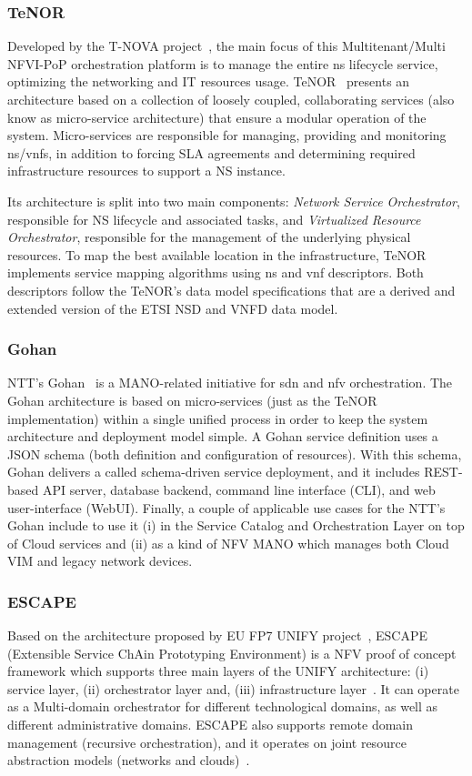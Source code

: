 \subsubsection{TeNOR}
Developed by the T-NOVA project~\cite{FP7projectT-NOVAT-NOVAInfrastructures}, the main focus of this Multitenant/Multi NFVI-PoP orchestration platform is to manage the entire \gls{ns} lifecycle service, optimizing the networking and IT resources usage. TeNOR~\cite{7502419} presents an architecture based on a collection of loosely coupled, collaborating services (also know as micro-service architecture) that ensure a modular operation of the system. Micro-services are responsible for managing, providing and monitoring \gls{ns}/\glspl{vnf}, in addition to forcing SLA agreements and determining required infrastructure resources to support a NS instance. 

Its architecture is split into two main components: \textit{Network Service Orchestrator}, responsible for NS lifecycle and associated tasks, and \textit{Virtualized Resource Orchestrator}, responsible for the management of the underlying physical resources. To map the best available location in the infrastructure, TeNOR implements service mapping algorithms using \gls{ns} and \gls{vnf} descriptors. Both descriptors follow the TeNOR's data model specifications that are a derived and extended version of the ETSI NSD and VNFD data model.

\subsubsection{Gohan}
NTT's Gohan~\cite{gohan} is a MANO-related initiative for \gls{sdn} and \gls{nfv} orchestration. The Gohan architecture is based on micro-services (just as the TeNOR implementation) within a single unified process in order to keep the system architecture and deployment model simple. A Gohan service definition uses a JSON schema (both definition and configuration of resources). With this schema, Gohan delivers a called schema-driven service deployment, and it includes REST-based API server, database backend, command line interface (CLI), and web user-interface (WebUI). Finally, a couple of applicable use cases for the NTT's Gohan include to use it (i) in the Service Catalog and Orchestration Layer on top of Cloud services and (ii) as a kind of NFV MANO which manages both Cloud VIM and legacy network devices. 

\subsubsection{ESCAPE}
Based on the architecture proposed by EU FP7 UNIFY project~\cite{unify}, ESCAPE (Extensible Service ChAin Prototyping Environment) is a NFV proof of concept framework which supports three main layers of the UNIFY architecture: (i) service layer, (ii) orchestrator layer and, (iii) infrastructure layer~\cite{csoma2014escape}. It can operate as a Multi-domain orchestrator for different technological domains, as well as different administrative domains. ESCAPE also supports remote domain management (recursive orchestration), and it operates on joint resource abstraction models (networks and clouds)~\cite{sonkoly2015multi}.  

